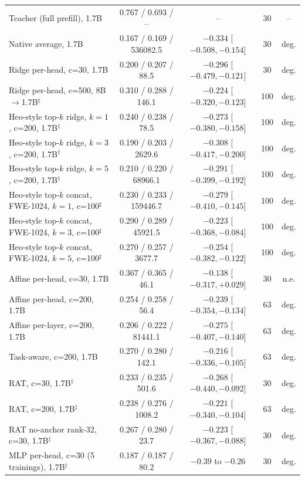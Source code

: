 \documentclass{article} %
\begin{document}
\begin{table}[t]
\begin{tabular}{lcccc}
Teacher (full prefill), 1.7B & 0.767 / 0.693 / -- & -- & 30 & -- \\
Native average, 1.7B & 0.167 / 0.169 / 536082.5 & $-0.334$ [$-0.508, -0.154$] & 30 & deg. \\
Ridge per-head, c=30, 1.7B & 0.200 / 0.207 / 88.5 & $-0.296$ [$-0.479, -0.121$] & 30 & deg. \\
Ridge per-head, c=500, 8B$\to$1.7B$^\ddagger$ & 0.310 / 0.288 / 146.1 & $-0.224$ [$-0.320, -0.123$] & 100 & deg. \\
Heo-style top-$k$ ridge, $k{=}1$, c=200, 1.7B$^\ddagger$ & 0.240 / 0.238 / 78.5 & $-0.273$ [$-0.380, -0.158$] & 100 & deg. \\
Heo-style top-$k$ ridge, $k{=}3$, c=200, 1.7B$^\ddagger$ & 0.190 / 0.203 / 2629.6 & $-0.308$ [$-0.417, -0.200$] & 100 & deg. \\
Heo-style top-$k$ ridge, $k{=}5$, c=200, 1.7B$^\ddagger$ & 0.210 / 0.220 / 68966.1 & $-0.291$ [$-0.399, -0.192$] & 100 & deg. \\
Heo-style top-$k$ concat, FWE-1024, $k{=}1$, c=100$^{\sharp}$ & 0.230 / 0.233 / 159446.7 & $-0.279$ [$-0.410, -0.145$] & 100 & deg. \\
Heo-style top-$k$ concat, FWE-1024, $k{=}3$, c=100$^{\sharp}$ & 0.290 / 0.289 / 45921.5 & $-0.223$ [$-0.368, -0.084$] & 100 & deg. \\
Heo-style top-$k$ concat, FWE-1024, $k{=}5$, c=100$^{\sharp}$ & 0.270 / 0.257 / 3677.7 & $-0.254$ [$-0.382, -0.122$] & 100 & deg. \\
Affine per-head, c=30, 1.7B & 0.367 / 0.365 / 46.1 & $-0.138$ [$-0.317, +0.029$] & 30 & n.e. \\
Affine per-head, c=200, 1.7B & 0.254 / 0.258 / 56.4 & $-0.239$ [$-0.354, -0.134$] & 63 & deg. \\
Affine per-layer, c=200, 1.7B & 0.206 / 0.222 / 81441.1 & $-0.275$ [$-0.407, -0.140$] & 63 & deg. \\
Task-aware, c=200, 1.7B & 0.270 / 0.280 / 142.1 & $-0.216$ [$-0.336, -0.105$] & 63 & deg. \\
RAT, c=30, 1.7B$^\ddagger$ & 0.233 / 0.235 / 501.6 & $-0.268$ [$-0.440, -0.092$] & 30 & deg. \\
RAT, c=200, 1.7B$^\ddagger$ & 0.238 / 0.276 / 1008.2 & $-0.221$ [$-0.340, -0.104$] & 63 & deg. \\
RAT no-anchor rank-32, c=30, 1.7B$^\ddagger$ & 0.267 / 0.280 / 23.7 & $-0.223$ [$-0.367, -0.088$] & 30 & deg. \\
MLP per-head, c=30 (5 trainings), 1.7B$^\ddagger$ & 0.187 / 0.187 / 80.2 & $-0.39$ to $-0.26$ & 30 & deg. \\

\end{tabular}
\end{table}
\end{document}
